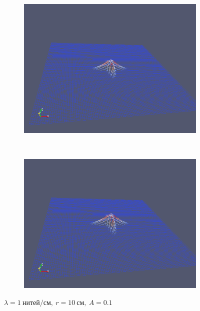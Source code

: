 \begin{figure}[H]
\begin{subfigure}[t]{0.5\textwidth}
        \includegraphics[width=\textwidth]{img/fiber/density_1_radius_10_amplitude_0.1/5.png}
    \end{subfigure}%
    ~
    \begin{subfigure}[t]{0.5\textwidth}
        \centering
        \includegraphics[width=\textwidth]{img/fiber/density_1_radius_10_amplitude_0.1/6.png}
    \end{subfigure}
    \caption{$\lambda=1~нитей/см,~r=10~см,~A=0.1$}
\end{figure}
